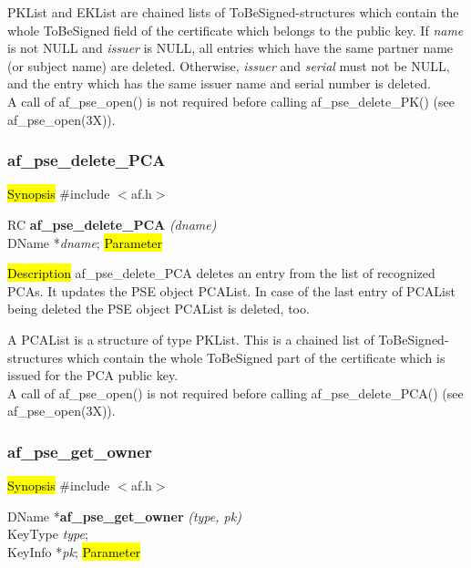 PKList and EKList are chained lists of ToBeSigned-structures which contain the
whole ToBeSigned field of the certificate which belongs to the public key. If 
{\em name} is not NULL and {\em issuer} is NULL, all entries which have the same partner name (or
subject name) are deleted. Otherwise, {\em issuer} and {\em serial} must not
be NULL, and the entry which has the same issuer name and serial number is
deleted.  
\\ [1em]
A call of af\_pse\_open() is not required before calling af\_pse\_delete\_PK()
(see af\_pse\_open(3X)).

\subsubsection{af\_pse\_delete\_PCA}
\label{af_del_PCA}
\hl{Synopsis}
\#include $<$af.h$>$ 

RC {\bf af\_pse\_delete\_PCA} {\em (dname)} \\
DName *{\em dname};
\hl{Parameter}

\hl{Description}
af\_pse\_delete\_PCA deletes an entry from the list of recognized PCAs. 
It updates the PSE object PCAList. In case of the last entry of PCAList
being deleted the PSE object PCAList is deleted, too.

A PCAList is a structure of type PKList.
This is a chained list of ToBeSigned-structures which contain the
whole ToBeSigned part of the certificate which is issued for the PCA public key.  
\\ [1em]
A call of af\_pse\_open() is not required before calling af\_pse\_delete\_PCA()
(see af\_pse\_open(3X)).

\subsubsection{af\_pse\_get\_owner}
\label{af_search_PK}
\hl{Synopsis}
\#include $<$af.h$>$

DName *{\bf af\_pse\_get\_owner} {\em (type, pk)} \\
KeyType {\em type}; \\
KeyInfo *{\em pk};
\hl{Parameter}


